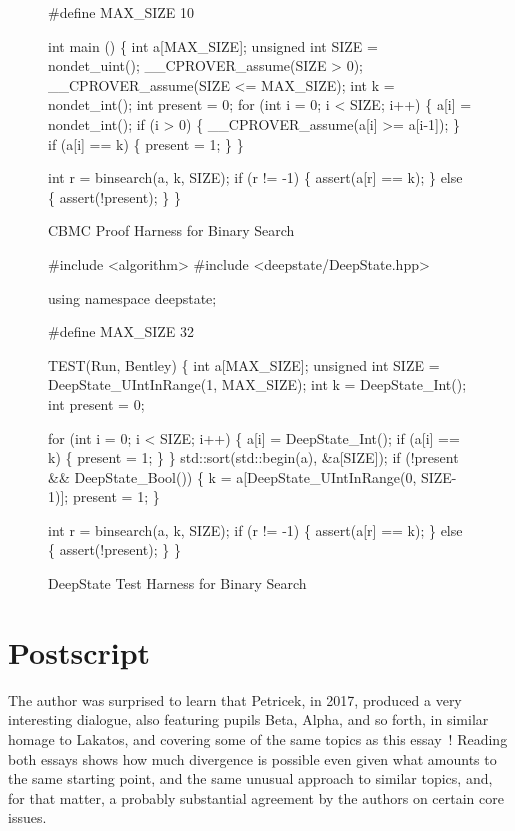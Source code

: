 \documentclass[sigplan]{acmart}
\begin{document}
\begin{figure}
  {\scriptsize
  \begin{code}
\#define MAX\_SIZE 10

int main () \{
  int a[MAX\_SIZE];
  unsigned int SIZE = nondet\_uint();
  \_\_CPROVER\_assume(SIZE > 0);
  \_\_CPROVER\_assume(SIZE <= MAX\_SIZE);
  int k = nondet\_int();
  int present = 0;
  for (int i = 0; i < SIZE; i++) \{
    a[i] = nondet\_int();
    if (i > 0) \{
      \_\_CPROVER\_assume(a[i] >= a[i-1]);
    \}
    if (a[i] == k) \{
      present = 1;
    \}
  \}

  int r = binsearch(a, k, SIZE);
  if (r != -1) \{
    assert(a[r] == k);
  \} else \{
    assert(!present);
  \}
  \}
\end{code}
}
\caption{CBMC Proof Harness for Binary Search}
\label{fig:cbmc}
\end{figure}


\begin{figure}
{\scriptsize
  \begin{code}
\#include <algorithm>
\#include <deepstate/DeepState.hpp>

using namespace deepstate;

\#define MAX\_SIZE 32

TEST(Run, Bentley) \{
  int a[MAX\_SIZE];
  unsigned int SIZE = DeepState\_UIntInRange(1, MAX\_SIZE);
  int k = DeepState\_Int();
  int present = 0;

  for (int i = 0; i < SIZE; i++) \{
    a[i] = DeepState\_Int();
    if (a[i] == k) \{
      present = 1;
    \}
  \}
  std::sort(std::begin(a), \&a[SIZE]);
  if (!present \&\& DeepState\_Bool()) \{
    k = a[DeepState\_UIntInRange(0, SIZE-1)];
    present = 1;
  \}

  int r = binsearch(a, k, SIZE);
  if (r != -1) \{
    assert(a[r] == k);
  \} else \{
    assert(!present);
  \}
\}
\end{code}
}
\caption{DeepState Test Harness for Binary Search}
\label{fig:deepstate}
\end{figure}

\section{Postscript}

The author was surprised to learn that Petricek, in 2017,
produced a very interesting dialogue, also featuring pupils Beta, Alpha, and so forth, in
similar homage to Lakatos, and covering some of the same topics as
this essay~\cite{DBLP:journals/programming/000117}!  Reading both
essays shows how much divergence is possible even given what amounts
to the same starting point, and the same unusual approach to similar
topics, and, for that matter, a probably substantial agreement by the
authors on certain core issues.
\end{document}
